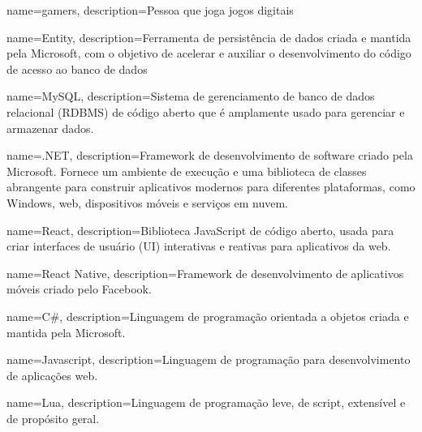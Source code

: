 





 {
    name=gamers,
    description={Pessoa que joga jogos digitais}
}

 {
    name=Entity,
    description={Ferramenta de persistência de dados criada e mantida  pela Microsoft, com o objetivo de acelerar e auxiliar o desenvolvimento do código de acesso ao banco de dados}
}

 {
    name=MySQL,
    description={Sistema de gerenciamento de banco de dados relacional (RDBMS) de código aberto que é amplamente usado para gerenciar e armazenar dados.}
}

 {
    name=.NET,
    description={Framework de desenvolvimento de software criado pela Microsoft. Fornece um ambiente de execução e uma biblioteca de classes abrangente para construir aplicativos modernos para diferentes plataformas, como Windows, web, dispositivos móveis e serviços em nuvem.}
}

 {
    name=React,
    description={Biblioteca JavaScript de código aberto, usada para criar interfaces de usuário (UI) interativas e reativas para aplicativos da web.}
}

 {
    name=React Native,
    description={Framework de desenvolvimento de aplicativos móveis criado pelo Facebook.}
}

 {
    name=C\#,
    description={Linguagem de programação orientada a objetos criada e mantida pela Microsoft.}
}

 {
    name=Javascript,
    description={Linguagem de programação para desenvolvimento de aplicações web.}
}

 {
    name=Lua,
    description={Linguagem de programação leve, de script, extensível e de propósito geral.}
}

